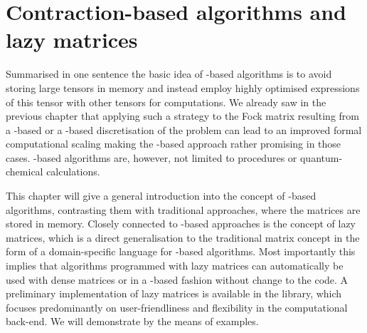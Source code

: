 \chapter{Contraction-based algorithms and lazy matrices}
\label{ch:LazyMatrices}
%
%

\noindent
Summarised in one sentence the basic idea of \contraction-based algorithms
is to avoid storing large tensors in memory
and instead employ highly optimised
\contraction expressions of this tensor with other tensors for computations.
We already saw in the previous chapter that applying
such a strategy to the Fock matrix resulting from a \FE-based
or a \CS-based discretisation of the \HF problem
can lead to an improved formal computational scaling
making the \contraction-based approach rather promising in those cases.
\contraction-based algorithms are, however,
not limited to \SCF procedures or quantum-chemical calculations.

This chapter will give a general introduction into
the concept of \contraction-based algorithms,
contrasting them with traditional approaches,
where the matrices are stored in memory.
Closely connected to \contraction-based approaches is the concept of lazy matrices,
which is a direct generalisation to the traditional matrix concept
in the form of a domain-specific language for \contraction-based algorithms.
Most importantly this implies that algorithms programmed
with lazy matrices can automatically
be used with dense matrices or in a \contraction-based fashion without change to the code.
A preliminary \cpp implementation of lazy matrices
is available in the \lazyten library,
which focuses predominantly on user-friendliness and flexibility
in the computational back-end.
We will demonstrate by the means of examples.




